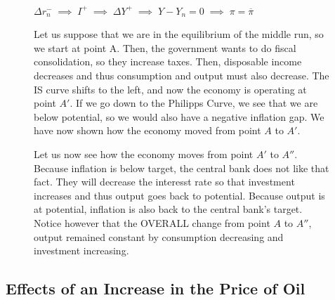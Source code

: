 \documentclass{extarticle}
\begin{document}
\begin{figure}[H]
\begin{minipage}{0.65\linewidth}
\begin{center}
 \\
$\Delta r_n^- \;\implies\; I^+ \;\implies\; \Delta Y^+ \;\implies\; Y - Y_n = 0 \;\implies\; \pi = \overline{\pi}$ 
\end{center}

Let us suppose that we are in the equilibrium of the middle run, so we start at point A. Then, the government wants to do fiscal consolidation, so they increase taxes. Then, disposable income decreases and thus consumption and output must also decrease. The IS curve shifts to the left, and now the economy is operating at point $A'$. If we go down to the Philipps Curve, we see that we are below potential, so we would also have a negative inflation gap. We have now shown how the economy moved from point $A$ to $A'$.
\vspace{2mm}

Let us now see how the economy moves from point $A'$ to $A''$. Because inflation is below target, the central bank does not like that fact. They will decrease the interesst rate so that investment increases and thus output goes back to potential. Because output is at potential, inflation is also back to the central bank's target. 
Notice however that the OVERALL change from point $A$ to $A''$, output remained constant by consumption decreasing and investment increasing.
  \end{minipage} 
\end{figure}

\subsection{Effects of an Increase in the Price of Oil}
\end{document}
